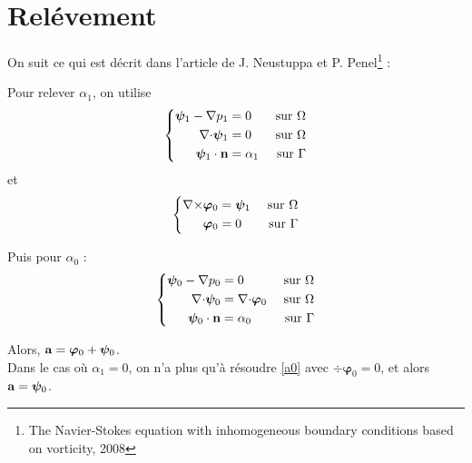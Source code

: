 \documentclass[a4paper,11pt]{article}
\begin{document}
\section{Relévement}
\label{relev}
On suit ce qui est décrit dans l'article de J. Neustuppa et P. Penel\footnote{The Navier-Stokes equation with inhomogeneous boundary conditions based on vorticity, 2008} :

Pour relever $\alpha_1$, on utilise
\begin{equation}\label{a1}
  \left\{
  \begin{aligned}
    \bm{\psi}_1 - {\nabla} p_1 &= 0 &\mbox{ sur }\Omega\\
    {\nabla\cdot}\bm{\psi}_1 &= 0 &\mbox{ sur }\Omega\\
    \bm{\psi}_1\cdot{\mathbf{n}} &= \alpha_1 &\mbox{ sur }\Gamma
  \end{aligned}
  \right.
\end{equation}
et
\begin{equation}
  \left\{
  \begin{aligned}
    {\nabla\times}\bm{\varphi}_0 &= \bm{\psi}_1 &\mbox{ sur }\Omega\\
    \bm{\varphi}_0 &= 0 &\mbox{ sur }\Gamma
  \end{aligned}
  \right.
\end{equation}

Puis pour $\alpha_0$ :
\begin{equation}\label{a0}
  \left\{
  \begin{aligned}
    \bm{\psi}_0 - {\nabla} p_0 &= 0 &\mbox{ sur }\Omega\\
    {\nabla\cdot}\bm{\psi}_0 &= {\nabla\cdot}\bm{\varphi}_0 &\mbox{ sur }\Omega\\
    \bm{\psi}_0\cdot{\mathbf{n}} &= \alpha_0 &\mbox{ sur }\Gamma
  \end{aligned}
  \right.
\end{equation}

Alors, ${\mathbf{a}}=\bm{\varphi}_0+\bm{\psi}_0$.\\

Dans le cas où $\alpha_1=0$, on n'a plus qu'à résoudre \ref{a0} avec $\div\bm{\varphi}_0=0$, et alors ${\mathbf{a}}=\bm{\psi}_0$.\\
\end{document}
